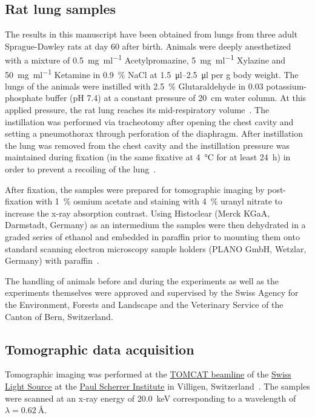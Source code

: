 \documentclass[a4paper,DIVcalc,abstract,english]{scrartcl}
\begin{document}
\subsection{Rat lung samples}
The results in this manuscript have been obtained from lungs from three adult Sprague-Dawley rats at day 60 after birth.
Animals were deeply anesthetized with a mixture of %
\SI{0.5}{\milli\gram\per\milli\litre} Acetylpromazine, %
\SI{5}{\milli\gram\per\milli\litre} Xylazine and %
\SI{50}{\milli\gram\per\milli\litre} Ketamine in %
\SI{0.9}{\percent} NaCl at \SIrange{1.5}{2.5}{\micro\litre} per \si{\gram} body weight.
The lungs of the animals were instilled with \SI{2.5}{\percent} Glutaraldehyde in \SI{0.03}{\Molar} potassium-phosphate buffer (pH 7.4) at a constant pressure of \SI{20}{\centi\meter} water column.
At this applied pressure, the rat lung reaches its mid-respiratory volume~\cite{Schittny1998}.
The instillation was performed via tracheotomy after opening the chest cavity and setting a pneumothorax through perforation of the diaphragm.
After instillation the lung was removed from the chest cavity and the instillation pressure was maintained during fixation (in the same fixative at \SI{4}{\celsius} for at least \SI{24}{\hour}) in order to prevent a recoiling of the lung~\cite{Tschanz2002}.

After fixation, the samples were prepared for tomographic imaging by post-fixation with \SI{1}{\percent} osmium acetate and staining with \SI{4}{\percent} uranyl nitrate to increase the x-ray absorption contrast.
Using Histoclear (Merck KGaA, Darmstadt, Germany) as an intermedium the samples were then dehydrated in a graded series of ethanol and embedded in paraffin prior to mounting them onto standard scanning electron microscopy sample holders (PLANO GmbH, Wetzlar, Germany) with paraffin~\cite{Tsuda2008}.

The handling of animals before and during the experiments as well as the experiments themselves were approved and supervised by the Swiss Agency for the Environment, Forests and Landscape and the Veterinary Service of the Canton of Bern, Switzerland.

\subsection{Tomographic data acquisition}
Tomographic imaging was performed at the \href{http://www.psi.ch/sls/tomcat/}{TOMCAT beamline} of the \href{http://www.psi.ch/sls/}{Swiss Light Source} at the \href{http://www.psi.ch/}{Paul Scherrer Institute} in Villigen, Switzerland~\cite{Stampanoni2006a}.
The samples were scanned at an x-ray energy of \SI{20.0}{\kilo\electronvolt} corresponding to a wavelength of \(\lambda=\SI{0.62}{\angstrom}\).%
\end{document}
